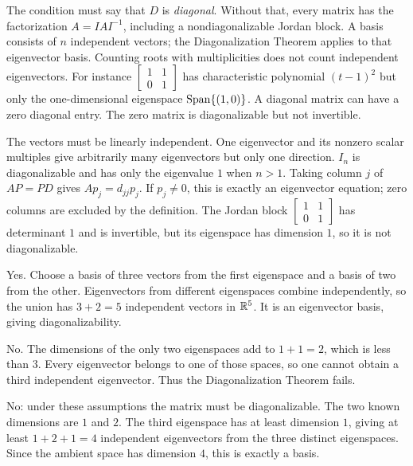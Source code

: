  The condition must say that $D$ is \emph{diagonal}. Without that, every matrix has the factorization $A=IAI^{-1}$, including a nondiagonalizable Jordan block.
 A basis consists of $n$ independent vectors; the Diagonalization Theorem applies to that eigenvector basis.
 Counting roots with multiplicities does not count independent eigenvectors. For instance $\left[\begin{smallmatrix}1&1\\0&1\end{smallmatrix}\right]$ has characteristic polynomial $(t-1)^2$ but only the one-dimensional eigenspace $\operatorname{Span}\{(1,0)\}$.
 A diagonal matrix can have a zero diagonal entry. The zero matrix is diagonalizable but not invertible.

 The vectors must be linearly independent. One eigenvector and its nonzero scalar multiples give arbitrarily many eigenvectors but only one direction.
 $I_n$ is diagonalizable and has only the eigenvalue $1$ when $n>1$.
 Taking column $j$ of $AP=PD$ gives $Ap_j=d_{jj}p_j$. If $p_j\ne0$, this is exactly an eigenvector equation; zero columns are excluded by the definition.
 The Jordan block $\left[\begin{smallmatrix}1&1\\0&1\end{smallmatrix}\right]$ has determinant $1$ and is invertible, but its eigenspace has dimension $1$, so it is not diagonalizable.

Yes. Choose a basis of three vectors from the first eigenspace and a basis of two from the other. Eigenvectors from different eigenspaces combine independently, so the union has $3+2=5$ independent vectors in $\mathbb{R}^5$. It is an eigenvector basis, giving diagonalizability.

No. The dimensions of the only two eigenspaces add to $1+1=2$, which is less than $3$. Every eigenvector belongs to one of those spaces, so one cannot obtain a third independent eigenvector. Thus the Diagonalization Theorem fails.

No: under these assumptions the matrix must be diagonalizable. The two known dimensions are $1$ and $2$. The third eigenspace has at least dimension $1$, giving at least $1+2+1=4$ independent eigenvectors from the three distinct eigenspaces. Since the ambient space has dimension $4$, this is exactly a basis.

